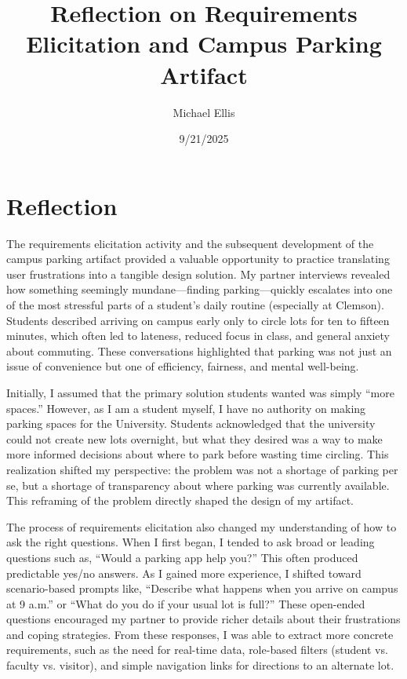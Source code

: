 \documentclass[12pt]{article}
\title{Reflection on Requirements Elicitation and Campus Parking Artifact}
\author{Michael Ellis}
\date{9/21/2025}
\begin{document}
\maketitle

\section*{Reflection}

The requirements elicitation activity and the subsequent development of the campus parking artifact provided a valuable opportunity to practice translating user frustrations into a tangible design solution. My partner interviews revealed how something seemingly mundane—finding parking—quickly escalates into one of the most stressful parts of a student’s daily routine (especially at Clemson). Students described arriving on campus early only to circle lots for ten to fifteen minutes, which often led to lateness, reduced focus in class, and general anxiety about commuting. These conversations highlighted that parking was not just an issue of convenience but one of efficiency, fairness, and mental well-being.

Initially, I assumed that the primary solution students wanted was simply “more spaces.” However, as I am a student myself, I have no authority on making parking spaces for the University. Students acknowledged that the university could not create new lots overnight, but what they desired was a way to make more informed decisions about where to park before wasting time circling. This realization shifted my perspective: the problem was not a shortage of parking per se, but a shortage of transparency about where parking was currently available. This reframing of the problem directly shaped the design of my artifact.

The process of requirements elicitation also changed my understanding of how to ask the right questions. When I first began, I tended to ask broad or leading questions such as, “Would a parking app help you?” This often produced predictable yes/no answers. As I gained more experience, I shifted toward scenario-based prompts like, “Describe what happens when you arrive on campus at 9 a.m.” or “What do you do if your usual lot is full?” These open-ended questions encouraged my partner to provide richer details about their frustrations and coping strategies. From these responses, I was able to extract more concrete requirements, such as the need for real-time data, role-based filters (student vs. faculty vs. visitor), and simple navigation links for directions to an alternate lot.
\end{document}
